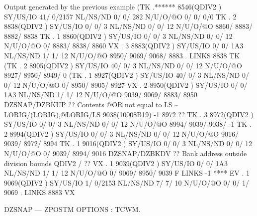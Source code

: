 \begin{landscapebody}
\begin{XMPt}{Output generated by the previous example}
(TK  .******     8546(QDIV2   ) SY/US/IO   41/    0/2157 NL/NS/ND    0/    0/     282 N/U/O/@O       0/       0/       0/0       
 TK  .     2     8838(QDIV2   ) SY/US/IO    0/    0/   3 NL/NS/ND    0/    0/      12 N/U/O/@O    8860/    8883/    8882/    8838
 TK  .     1     8860(QDIV2   ) SY/US/IO    0/    0/   3 NL/NS/ND    0/    0/      12 N/U/O/@O       0/    8883/    8838/    8860
 VX  .     3     8883(QDIV2   ) SY/US/IO    0/    0/ 1A3 NL/NS/ND    1/    1/      12 N/U/O/@O    8950/    9069/    9068/    8883
     . LINKS      8838 TK                                                                                                        
(TK  .     2     8905(QDIV2   ) SY/US/IO   40/    0/   3 NL/NS/ND    0/    0/      12 N/U/O/@O    8927/    8950/    8949/       0
(TK  .     1     8927(QDIV2   ) SY/US/IO   40/    0/   3 NL/NS/ND    0/    0/      12 N/U/O/@O       0/    8950/    8905/    8927
 VX  .     2     8950(QDIV2   ) SY/US/IO    0/    0/ 1A3 NL/NS/ND    1/    1/      12 N/U/O/@O    9039/    9069/    8883/    8950
 DZSNAP/DZBKUP ?? Contents @OR not equal to LS -- LORIG/(LORIG),@LORIG/LS                 9038(10008B19)      -1    8972       ?? 
 TK  .     3     8972(QDIV2   ) SY/US/IO    0/    0/   3 NL/NS/ND    0/    0/      12 N/U/O/@O    8994/    9039/    9038/      -1
 TK  .     2     8994(QDIV2   ) SY/US/IO    0/    0/   3 NL/NS/ND    0/    0/      12 N/U/O/@O    9016/    9039/    8972/    8994
 TK  .     1     9016(QDIV2   ) SY/US/IO    0/    0/   3 NL/NS/ND    0/    0/      12 N/U/O/@O       0/    9039/    8994/    9016
 DZSNAP/DZBKDV ?? Bank address outside division bounds                                QDIV2   /                                ?? 
 VX  .     1     9039(QDIV2   ) SY/US/IO    0/    0/ 1A3 NL/NS/ND    1/    1/      12 N/U/O/@O       0/    9069/    8950/    9039
     F LINKS        -1 ****                                                                                                      
 EV  .     1     9069(QDIV2   ) SY/US/IO    1/    0/2153 NL/NS/ND    7/    7/      10 N/U/O/@O       0/       0/       1/    9069
     . LINKS      8883 VX                                                                                                        
                                                                                                                                 
DZSNAP --- ZPOSTM                                                                                  OPTIONS : TCWM.               
                                                                                                                                 

\end{XMPt}
\end{landscapebody}
